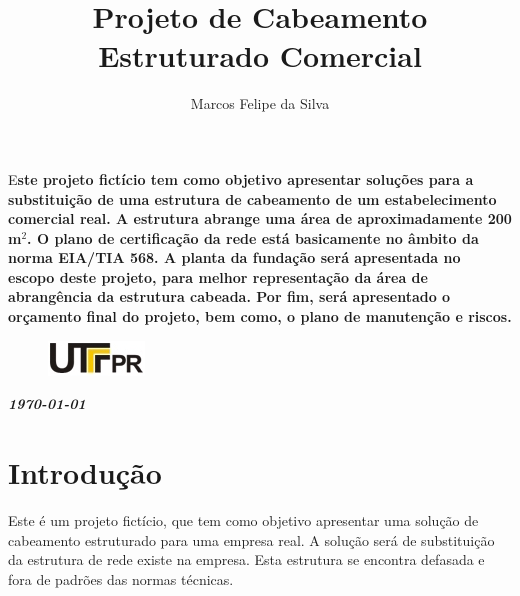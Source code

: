 \documentclass[	DIV=calc,%
							paper=a4,%
							fontsize=12pt,%
							onecolumn]{scrartcl}	 					%
\title{Projeto de Cabeamento Estruturado Comercial}					%
\author{Marcos Felipe da Silva }  	%
\date{}																				%
\newcommand{\initial}[1]{%
     \lettrine[lines=3,lhang=0.3,nindent=0em]{
     				\color{DarkGoldenrod}
     				{\textsf{#1}}}{}}
\begin{document}
\maketitle
\thispagestyle{fancy} 	
\thispagestyle{empty}		%





\initial{E}\textbf{ste projeto fictício tem como objetivo apresentar soluções para a substituição de uma estrutura de cabeamento de um estabelecimento comercial real. A estrutura abrange uma área de aproximadamente 200 m$^{2}$. O plano de certificação da rede está basicamente no âmbito da norma EIA/TIA 568.  A planta da fundação será apresentada no escopo deste projeto, para melhor representação da área de abrangência da estrutura cabeada. Por fim, será apresentado o orçamento final do projeto, bem como, o plano de manutenção e riscos.}


\begin{figure}
	\centering
	\includegraphics{utfpr}
\end{figure}

\vspace{2cm}
\centerline{\textit{\textbf{\today}}}

\clearpage
    \renewcommand*\listfigurename{Lista de figuras}
\listoffigures

\renewcommand*\listtablename{Lista de tabelas}
\listoftables




\clearpage
\renewcommand{\contentsname}{Sumário}
\tableofcontents
\clearpage

\section{Introdução}

Este é um projeto fictício, que tem como objetivo apresentar uma solução de cabeamento estruturado para uma empresa real. A solução será de substituição da estrutura de rede existe na empresa. Esta estrutura se encontra defasada e fora de padrões das normas técnicas. 
\end{document}
